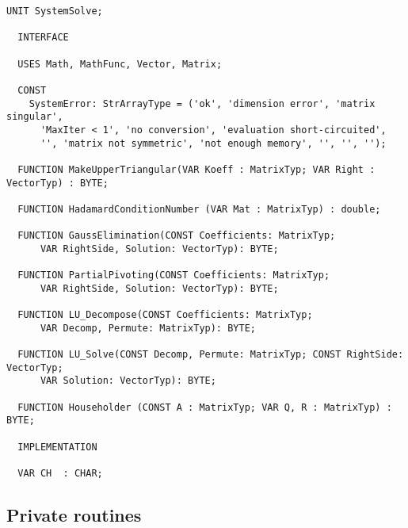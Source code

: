 \begin{lstlisting}[caption=Interface of SystemSolve]
  UNIT SystemSolve;

  INTERFACE

  USES Math, MathFunc, Vector, Matrix;

  CONST
    SystemError: StrArrayType = ('ok', 'dimension error', 'matrix singular',
      'MaxIter < 1', 'no conversion', 'evaluation short-circuited',
      '', 'matrix not symmetric', 'not enough memory', '', '', '');

  FUNCTION MakeUpperTriangular(VAR Koeff : MatrixTyp; VAR Right : VectorTyp) : BYTE;

  FUNCTION HadamardConditionNumber (VAR Mat : MatrixTyp) : double;

  FUNCTION GaussElimination(CONST Coefficients: MatrixTyp;
      VAR RightSide, Solution: VectorTyp): BYTE;

  FUNCTION PartialPivoting(CONST Coefficients: MatrixTyp;
      VAR RightSide, Solution: VectorTyp): BYTE;

  FUNCTION LU_Decompose(CONST Coefficients: MatrixTyp;
      VAR Decomp, Permute: MatrixTyp): BYTE;

  FUNCTION LU_Solve(CONST Decomp, Permute: MatrixTyp; CONST RightSide: VectorTyp;
      VAR Solution: VectorTyp): BYTE;

  FUNCTION Householder (CONST A : MatrixTyp; VAR Q, R : MatrixTyp) : BYTE;

  IMPLEMENTATION

  VAR CH  : CHAR;
\end{lstlisting}

\subsection{Private routines}

